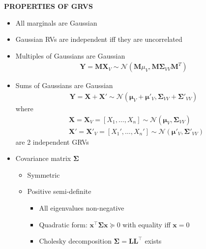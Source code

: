 \begin{whitebox}{\textbf{PROPERTIES OF GRVS}}
    \begin{itemize}
        \item All marginals are Gaussian
        \item Gaussian RVs are independent iff they are uncorrelated
        \item Multiples of Gaussians are Gaussian
        \begin{align*}
            \bm{Y}=\bm{MX}_V\sim\mathcal{N}(\bm{M}\mu_V,\bm{M}\bm{\Sigma}_{VV}\bm{M}^T)
        \end{align*}
        \item Sums of Gaussians are Gaussian
        \begin{align*}
            \bm{Y}=\bm{X}+\bm{X}'\sim\mathcal{N}(\bm{\mu}_V+
            \bm{\mu}'_V,\bm{\Sigma}_{VV}+\bm{\Sigma}'_{VV})
        \end{align*}
        where
        \begin{align*}
            &\bm{X}=\bm{X}_V=[X_1,\hdots,X_n]\sim\mathcal{N}(\bm{\mu}_V,\bm{\Sigma}_{VV})\\
            &\bm{X'}=\bm{X}'_V=[X_1',\hdots,X_n']\sim\mathcal{N}(\bm{\mu}'_V,\bm{\Sigma}'_{VV})
        \end{align*}
        are 2 independent GRVs
        \item Covariance matrix $\bm{\Sigma}$
        \begin{itemize}
            \item Symmetric
            \item Positive semi-definite
            \begin{itemize}
                \item All eigenvalues non-negative
                \item Quadratic form: $\bm{x}^\top\bm{\Sigma x}\succcurlyeq 0$ with equality iff $\bm{x}=0$
                \item Cholesky decomposition $\bm{\Sigma}=\bm{LL}^\top$ exists
            \end{itemize}
        \end{itemize}
    \end{itemize}
\end{whitebox}

